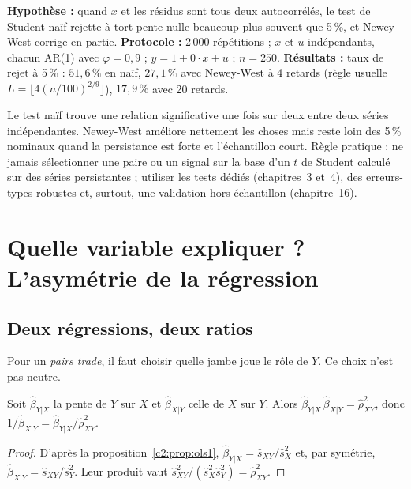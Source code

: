 \begin{codebox}
\textbf{Hypothèse :} quand $x$ et les résidus sont tous deux autocorrélés, le test de Student naïf rejette à tort \og pente nulle\fg{} beaucoup plus souvent que 5\,\%, et Newey-West corrige en partie. \textbf{Protocole :} 2\,000 répétitions ; $x$ et $u$ indépendants, chacun AR(1) avec $\varphi = 0{,}9$ ; $y = 1 + 0\cdot x + u$ ; $n = 250$. \textbf{Résultats :} taux de rejet à 5\,\% : $51{,}6\,\%$ en naïf, $27{,}1\,\%$ avec Newey-West à 4 retards (règle usuelle $L = \lfloor 4(n/100)^{2/9}\rfloor$), $17{,}9\,\%$ avec 20 retards.
\end{codebox}

\begin{pitfall}
Le test naïf trouve une relation significative une fois sur deux entre deux séries indépendantes. Newey-West améliore nettement les choses mais reste loin des 5\,\% nominaux quand la persistance est forte et l'échantillon court. Règle pratique : ne jamais sélectionner une paire ou un signal sur la base d'un $t$ de Student calculé sur des séries persistantes ; utiliser les tests dédiés (chapitres~3 et~4), des erreurs-types robustes et, surtout, une validation hors échantillon (chapitre~16).
\end{pitfall}

\section{Quelle variable expliquer ? L'asymétrie de la régression}

\subsection{Deux régressions, deux ratios}

Pour un \emph{pairs trade}, il faut choisir quelle jambe joue le rôle de $Y$. Ce choix n'est pas neutre.

\begin{proposition}\label{c2:prop:asym}
Soit $\hat\beta_{Y|X}$ la pente de $Y$ sur $X$ et $\hat\beta_{X|Y}$ celle de $X$ sur $Y$. Alors $\hat\beta_{Y|X}\,\hat\beta_{X|Y} = \hat\rho_{XY}^2$, donc $1/\hat\beta_{X|Y} = \hat\beta_{Y|X}/\hat\rho_{XY}^2$.
\end{proposition}
\begin{proof}
D'après la proposition~\ref{c2:prop:ols1}, $\hat\beta_{Y|X} = \hat s_{XY}/\hat s_X^2$ et, par symétrie, $\hat\beta_{X|Y} = \hat s_{XY}/\hat s_Y^2$. Leur produit vaut $\hat s_{XY}^2/(\hat s_X^2\hat s_Y^2) = \hat\rho_{XY}^2$.
\end{proof}

